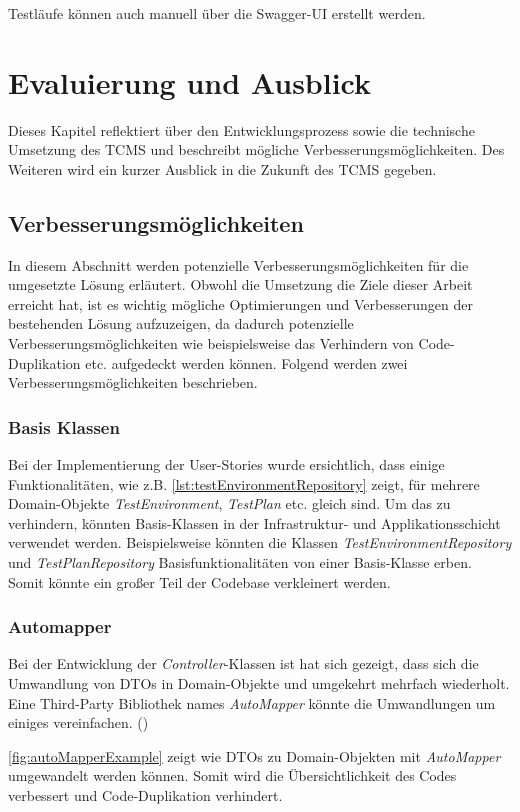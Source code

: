 \documentclass[a4paper, fontsize=11pt, parskip=half, twoside]{scrreprt}
\begin{document}
	Testläufe können auch manuell über die Swagger-UI erstellt werden.
	
	\chapter{Evaluierung und Ausblick}
	Dieses Kapitel reflektiert über den Entwicklungsprozess sowie die technische Umsetzung des \ac{TCMS} und beschreibt mögliche Verbesserungsmöglichkeiten.
	Des Weiteren wird ein kurzer Ausblick in die Zukunft des \ac{TCMS} gegeben.
	
	\section{Verbesserungsmöglichkeiten}
	In diesem Abschnitt werden potenzielle Verbesserungsmöglichkeiten für die umgesetzte Lösung erläutert.
	Obwohl die Umsetzung die Ziele dieser Arbeit erreicht hat, ist es wichtig mögliche Optimierungen und Verbesserungen der bestehenden Lösung aufzuzeigen, da dadurch potenzielle Verbesserungsmöglichkeiten wie beispielsweise das Verhindern von Code-Duplikation etc. aufgedeckt werden können.
	Folgend werden zwei Verbesserungsmöglichkeiten beschrieben.

	\subsection{Basis Klassen}
	Bei der Implementierung der User-Stories wurde ersichtlich, dass einige Funktionalitäten, wie z.B. \autoref{lst:testEnvironmentRepository} zeigt, für mehrere Domain-Objekte \emph{TestEnvironment}, \emph{TestPlan} etc. gleich sind.
	Um das zu verhindern, könnten Basis-Klassen in der Infrastruktur- und Applikationsschicht verwendet werden.
	Beispielsweise könnten die Klassen \emph{TestEnvironmentRepository} und \emph{TestPlanRepository} Basisfunktionalitäten von einer Basis-Klasse erben.
	Somit könnte ein großer Teil der Codebase verkleinert werden.
	
	\subsection{Automapper}
	Bei der Entwicklung der \emph{Controller}-Klassen ist hat sich gezeigt, dass sich die Umwandlung von \ac{DTO}s in Domain-Objekte und umgekehrt mehrfach wiederholt.
	Eine Third-Party Bibliothek names \emph{AutoMapper} könnte die Umwandlungen um einiges vereinfachen. (\textcite{noauthor_automapper_nodate})
	
	\autoref{fig:autoMapperExample} zeigt wie \ac{DTO}s zu Domain-Objekten mit \emph{AutoMapper} umgewandelt werden können.
	Somit wird die Übersichtlichkeit des Codes verbessert und Code-Duplikation verhindert.
	
\end{document}

